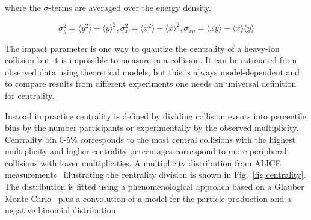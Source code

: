 \noindent where the $\sigma$-terms are averaged over the energy density.

\begin{equation}
\sigma_y^2=\langle y^2\rangle-\langle y \rangle ^2, \sigma_x^2=\langle x^2\rangle-\langle x \rangle ^2, \sigma_{xy}=\langle xy \rangle - \langle x \rangle \langle y \rangle
\end{equation}

The impact parameter is one way to quantize the centrality of a heavy-ion collision but it is impossible to measure in a collision. It can be estimated from observed data using theoretical models, but this is always model-dependent and to compare results from different experiments one needs an universal definition for centrality. %






Instead in practice centrality is defined by dividing collision events into percentile bins by the number participants or experimentally by the observed multiplicity. Centrality bin 0-5\% corresponds to the most central collisions with the highest multiplicity and higher centrality percentages correspond to more peripheral collisions with lower multiplicities. A multiplicity distribution from ALICE measurements~\cite{PhysRevC.88.044909} illustrating the centrality division is shown in Fig.~\ref{fig:centrality}. The distribution is fitted using a phenomenological approach based on a Glauber Monte Carlo~\cite{Miller:2007ri} plus a convolution of a model for the particle production and a negative binomial distribution. 


